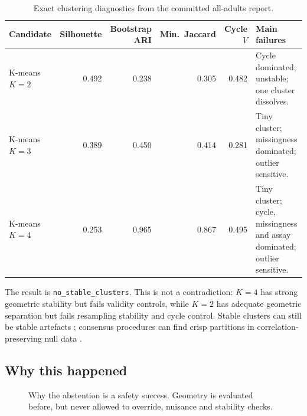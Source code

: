 \documentclass[11pt,a4paper]{article}
\newcommand{\code}[1]{\texttt{\small #1}}
\begin{document}
\begin{table}[H]
\centering
\small
\caption{Exact clustering diagnostics from the committed all-adults report.}
\begin{tabular}{lrrrrp{46mm}}
\toprule
Candidate & Silhouette & Bootstrap ARI & Min.\ Jaccard & Cycle \(V\) & Main failures \\
\midrule
K-means \(K=2\) & 0.492 & 0.238 & 0.305 & 0.482 &
Cycle dominated; unstable; one cluster dissolves. \\
K-means \(K=3\) & 0.389 & 0.450 & 0.414 & 0.281 &
Tiny cluster; missingness dominated; outlier sensitive. \\
K-means \(K=4\) & 0.253 & 0.965 & 0.867 & 0.495 &
Tiny cluster; cycle, missingness and assay dominated; outlier sensitive. \\
\bottomrule
\end{tabular}
\label{tab:cluster-results}
\end{table}

The result is \code{no\_stable\_clusters}. This is not a contradiction:
\(K=4\) has strong geometric stability but fails validity controls, while \(K=2\)
has adequate geometric separation but fails resampling stability and cycle
control. Stable clusters can still be stable artefacts \citep{hennig2007};
consensus procedures can find crisp partitions in correlation-preserving null
data \citep{senbabaoglu2014,m3c2020}.

\subsection{Why this happened}

\begin{figure}[H]
\centering
{}
\caption{Why the abstention is a safety success. Geometry is evaluated before,
but never allowed to override, nuisance and stability checks.}
\label{fig:abstention}
\end{figure}
\end{document}
